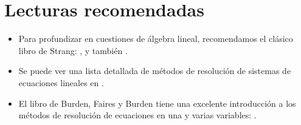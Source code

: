 \section{Lecturas recomendadas}

\begin{itemize}
 \item Para profundizar en cuestiones de álgebra lineal, recomendamos el clásico libro de Strang: , y también .
 \item Se puede ver una lista detallada de métodos de resolución de sistemas de ecuaciones lineales en .
 \item El libro de Burden, Faires y Burden tiene una excelente introducción a los métodos de resolución de ecuaciones en una y varias variables: .
\end{itemize}
